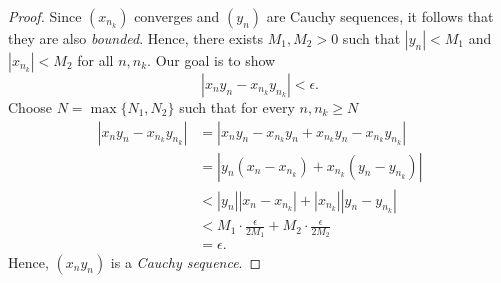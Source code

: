 \begin{enumerate}
\begin{proof}
            Since \((x_{n_k})\) converges and \((y_{n})\) are Cauchy sequences, it follows that they are also \textit{bounded}. Hence, there exists \(M_1, M_2 > 0 \) such that \( |y_n| < M_1\) and \( |x_{n_k}| < M_2 \) for all \( n, n_k \). Our goal is to show 
            \[ |x_ny_n - x_{n_k}y_{n_k}| < \epsilon.\]
            Choose \( N = \max \{ N_1, N_2 \}\) such that for every \( n, n_k \geq N \)
            \begin{align*}
                |x_ny_n - x_{n_k}y_{n_k}| &= |x_n y_n - x_{n_k}y_n + x_{n_k}y_n -x_{n_k}y_{n_k} |  \\
                                          &= | y_n (x_n - x_{n_k}) + x_{n_k}(y_n - y_{n_k})| \\
                                          &< |y_n| |x_n - x_{n_k}| + |x_{n_k}| |y_n - y_{n_k}| \\
                                          &< M_1 \cdot \frac{\epsilon}{2 M_1} + M_2 \cdot \frac{\epsilon}{2M_2} \\
                                          &= \epsilon.
            \end{align*}
            Hence, \((x_ny_n)\) is a \textit{Cauchy sequence}.
        \end{proof}
\end{enumerate}

